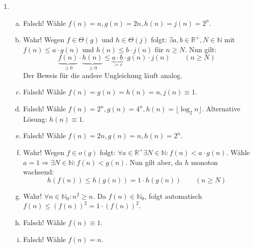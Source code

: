 \documentclass{scrartcl}
\begin{document}
\begin{enumerate}[(1)]
\item \begin{enumerate}[(a)]
\item Falsch! W\"ahle $f(n)=n, g(n)=2n, h(n)=j(n)=2^n$.
\item Wahr! Wegen $f\in\Theta(g)$ und $h\in\Theta(j)$ folgt: $\exists a,b\in \mathbb{R}^+, N\in\mathbb{N}$ mit $f(n)\leq a\cdot g(n)$ und $h(n)\leq b\cdot j(n)$ f\"ur $n\geq N$. Nun gilt:
$$\underbrace{f(n)}_{\geq 0}\cdot\underbrace{h(n)}_{\geq 0}\leq \underbrace{a\cdot b}_{:=c}\cdot g(n)\cdot j(n)\qquad (n\geq N)$$
Der Beweis f\"ur die andere Ungleichung l\"auft analog.
\item Falsch! W\"ahle $f(n)=g(n)=h(n)=n, j(n)\equiv 1$.
\item Falsch! W\"ahle $f(n)=2^n, g(n)=4^n, h(n)=\lfloor \log_2 n\rfloor$.\newline
Alternative L\"osung: $h(n)\equiv 1$.
\item Falsch! W\"ahle $f(n)=2n, g(n)=n, h(n)=2^n$.
\item Wahr! Wegen $f\in o(g)$ folgt: $\forall a\in\mathbb{R}^+\exists N\in\mathbb{N}: f(n)<a\cdot g(n)$. W\"ahle $a=1\Rightarrow \exists N\in \mathbb{N}:f(n)<g(n)$. Nun gilt aber, da $h$ monoton wachsend:
$$h(f(n))\leq h(g(n))=1\cdot h(g(n))\qquad (n\geq N)$$
\item Wahr! $\forall n\in \mathbb{N}_0: n^2\geq n$. Da $f(n)\in\mathbb{N}_0$, folgt automatisch $f(n)\leq (f(n))^2=1\cdot (f(n))^2$.
\item Falsch! W\"ahle $f(n)\equiv 1$.
\item Falsch! W\"ahle $f(n)=n$.
\end{enumerate}

\end{enumerate}
\end{document}
